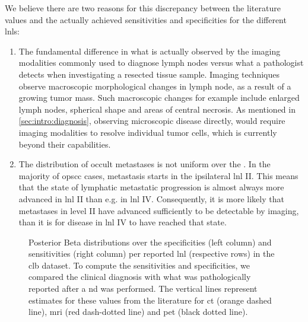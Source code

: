 \documentclass[\relativeRoot/main.tex]{subfiles}
\begin{document}
We believe there are two reasons for this discrepancy between the literature values and the actually achieved sensitivities and specificities for the different \glspl{lnl}:

\begin{enumerate}
    \item The fundamental difference in what is actually observed by the imaging modalities commonly used to diagnose lymph nodes versus what a pathologist detects when investigating a resected tissue sample. Imaging techniques observe macroscopic morphological changes in lymph node, as a result of a growing tumor mass. Such macroscopic changes for example include enlarged lymph nodes, spherical shape and areas of central necrosis. As mentioned in \cref{sec:intro:diagnosis}, observing microscopic disease directly, would require imaging modalities to resolve individual tumor cells, which is currently beyond their capabilities.
    \item The distribution of occult metastases is not uniform over the . In the majority of \gls{opscc} cases, metastasis starts in the ipsilateral \gls{lnl} II. This means that the state of lymphatic metastatic progression is almost always more advanced in \gls{lnl} II than e.g. in \gls{lnl} IV. Consequently, it is more likely that metastases in level II have advanced sufficiently to be detectable by imaging, than it is for disease in \gls{lnl} IV to have reached that state.
\end{enumerate}

\begin{figure}
    \centering
    \def\svgwidth{1.0\textwidth}
    
    \caption[
        Sensitivity and specificity per LNL in the CLB dataset
    ]{
        Posterior Beta distributions over the specificities (left column) and sensitivities (right column) per reported \gls{lnl} (respective rows) in the \gls{clb} dataset. To compute the sensitivities and specificities, we compared the clinical diagnosis with what was pathologically reported after a \acrlong{nd} was performed. The vertical lines represent estimates for these values from the literature \cite{de_bondt_detection_2007,kyzas_18f-fluorodeoxyglucose_2008} for \gls{ct} (orange dashed line), \gls{mri} (red dash-dotted line) and \gls{pet} (black dotted line).
    }
    \label{fig:dataset_clb:sens_spec}
\end{figure}
\end{document}
